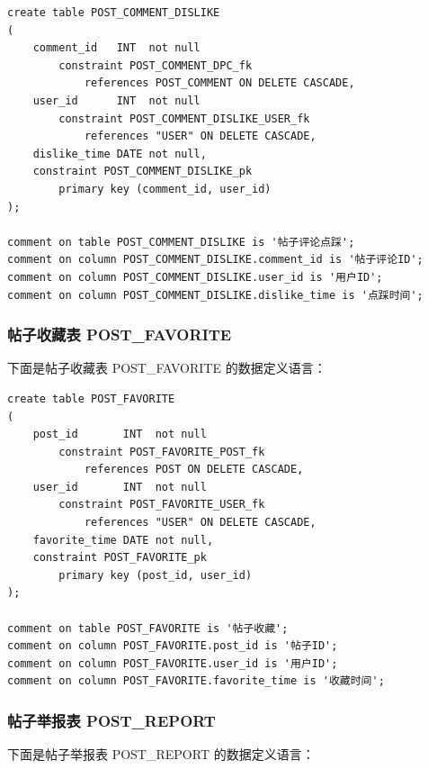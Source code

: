 \begin{verbatim}
create table POST_COMMENT_DISLIKE
(
    comment_id   INT  not null
        constraint POST_COMMENT_DPC_fk
            references POST_COMMENT ON DELETE CASCADE,
    user_id      INT  not null
        constraint POST_COMMENT_DISLIKE_USER_fk
            references "USER" ON DELETE CASCADE,
    dislike_time DATE not null,
    constraint POST_COMMENT_DISLIKE_pk
        primary key (comment_id, user_id)
);

comment on table POST_COMMENT_DISLIKE is '帖子评论点踩';
comment on column POST_COMMENT_DISLIKE.comment_id is '帖子评论ID';
comment on column POST_COMMENT_DISLIKE.user_id is '用户ID';
comment on column POST_COMMENT_DISLIKE.dislike_time is '点踩时间';
\end{verbatim}

\subsubsection{帖子收藏表 POST\_FAVORITE}

下面是帖子收藏表 POST\_FAVORITE 的数据定义语言：

\begin{verbatim}
create table POST_FAVORITE
(
    post_id       INT  not null
        constraint POST_FAVORITE_POST_fk
            references POST ON DELETE CASCADE,
    user_id       INT  not null
        constraint POST_FAVORITE_USER_fk
            references "USER" ON DELETE CASCADE,
    favorite_time DATE not null,
    constraint POST_FAVORITE_pk
        primary key (post_id, user_id)
);

comment on table POST_FAVORITE is '帖子收藏';
comment on column POST_FAVORITE.post_id is '帖子ID';
comment on column POST_FAVORITE.user_id is '用户ID';
comment on column POST_FAVORITE.favorite_time is '收藏时间';
\end{verbatim}

\subsubsection{帖子举报表 POST\_REPORT}

下面是帖子举报表 POST\_REPORT 的数据定义语言：


